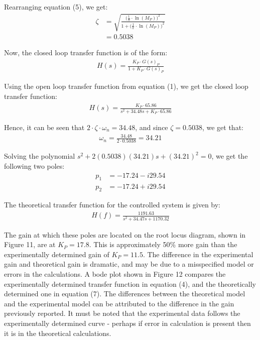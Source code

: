 \documentclass{article}
\begin{document}
Rearranging equation (5), we get:
\begin{align*}
	\zeta  	&= \sqrt{\frac{\big(\frac{1}{\pi} \cdot \ln(M_P)\big)^2}{1 + \big(\frac{1}{\pi} \cdot \ln(M_P)\big)^2}}\\
			&= 0.5038
\end{align*}

Now, the closed loop transfer function is of the form:
\begin{align*}
	H(s) = \frac{K_P \cdot G(s)_P}{1 + K_P \cdot G(s)_P}
\end{align*}

Using the open loop transfer function from equation (1), we get the closed loop transfer function:
\begin{align}
	H(s) = \frac{K_P \cdot 65.86}{s^2 + 34.48s + K_P \cdot 65.86}
\end{align}

Hence, it can be seen that $2 \cdot \zeta \cdot \omega_n = 34.48$, and since $\zeta = 0.5038$, we get that:
\begin{align*}
	\omega_n = \frac{34.48}{2 \cdot 0.5038} = 34.21
\end{align*}

Solving the polynomial $s^2 + 2 (0.5038) (34.21)s + (34.21)^2 = 0$, we get the following two poles:
\begin{align*}
	p_1 &= -17.24 - i29.54\\
	p_2 &= -17.24 + i29.54
\end{align*}

The theoretical transfer function for the controlled system is given by:
\begin{align}
	H(f) = \frac{1191.63}{s^2 + 34.47s + 1170.32}
\end{align}

The gain at which these poles are located on the root locus diagram, shown in Figure 11, are at $K_P = 17.8$. This is approximately 50\% more gain than the experimentally determined gain of $K_P = 11.5$. The difference in the experimental gain and theoretical gain is dramatic, and may be due to a misspecified model or errors in the calculations. A bode plot shown in Figure 12 compares the experimentally determined transfer function in equation (4), and the theoretically determined one in equation (7). The differences between the theoretical model and the experimental model can be attributed to the difference in the gain previously reported. It must be noted that the experimental data follows the experimentally determined curve - perhaps if error in calculation is present then it is in the theoretical calculations.
\end{document}
